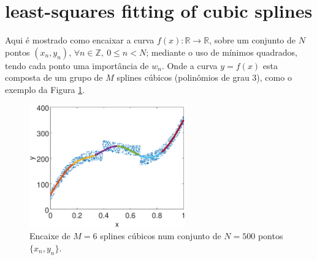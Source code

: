 
\section{least-squares fitting of cubic splines}
\label{sec:spline3method1}

Aqui é mostrado como encaixar a curva $f(x):\mathbb{R}\rightarrow \mathbb{R}$, 
 sobre um conjunto de $N$ pontos $(x_n,y_n)$,
$\forall n \in \mathbb{Z},~0\leq n < N$; mediante o uso de mínimos quadrados, tendo
cada ponto uma importância de $w_n$.
Onde a curva 
$y=f(x)$ esta composta de um grupo de $M$ splines cúbicos (polinômios de grau 3), 
como o exemplo da Figura \ref{fig:leastmeanspline3}.
\begin{figure}[!htb]
\centering
\includegraphics[width=0.6\textwidth]{section-cubic-splines/splines3demo.eps}
\caption{Encaixe de $M=6$ splines cúbicos num conjunto de $N=500$ pontos $\{x_n,y_n\}$.}
\label{fig:leastmeanspline3}
\end{figure}


